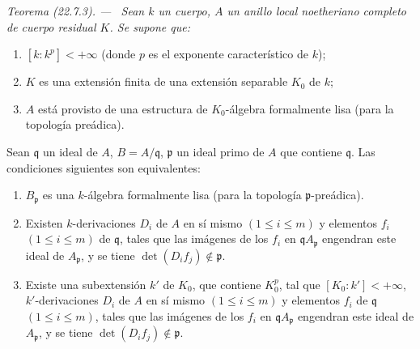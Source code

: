 \documentclass[10pt,oneside]{book}
\makeatletter
\newcommand{\setmanualcurrentlabel}[1]{\def\@currentlabel{#1}}
\newenvironment{theorem}[1][]{%
  \setmanualcurrentlabel{#1}\par\medskip\noindent\itshape Teorema (#1). ---\ }{\par}
\makeatother
\begin{document}
\begin{theorem}[22.7.3]
\label{0.22.7.3-es}
Sean $k$ un cuerpo, $A$ un anillo local noetheriano completo de cuerpo residual
$K$. Se supone que:
\begin{enumerate}
  \item[$1^\circ$] $[k:k^p]<+\infty$ (donde $p$ es el exponente característico
  de $k$);
  \item[$2^\circ$] $K$ es una extensión finita de una extensión separable
  $K_0$ de $k$;
  \item[$3^\circ$] $A$ está provisto de una estructura de $K_0$-álgebra formalmente
  lisa (para la topología preádica).
\end{enumerate}
Sean $\mathfrak q$ un ideal de $A$, $B=A/\mathfrak q$, $\mathfrak p$ un
ideal primo de $A$ que contiene $\mathfrak q$. Las condiciones siguientes son
equivalentes:
\begin{enumerate}
  \item[\textup{a)}] $B_{\mathfrak p}$ es una $k$-álgebra formalmente lisa (para la
  topología $\mathfrak p$-preádica).
  \item[\textup{b)}] Existen $k$-derivaciones $D_i$ de $A$ en sí mismo
  $(1\leq i\leq m)$ y elementos $f_i$ $(1\leq i\leq m)$ de
  $\mathfrak q$, tales que las imágenes de los $f_i$ en
  $\mathfrak qA_{\mathfrak p}$ engendran este ideal de $A_{\mathfrak p}$, y
  se tiene $\det(D_if_j)\notin\mathfrak p$.
  \item[\textup{b')}] Existe una subextensión $k'$ de $K_0$, que contiene $K_0^p$,
  tal que $[K_0:k']<+\infty$, $k'$-derivaciones $D_i$ de $A$ en
  sí mismo $(1\leq i\leq m)$ y elementos $f_i$ de $\mathfrak q$
  $(1\leq i\leq m)$, tales que las imágenes de los $f_i$ en
  $\mathfrak qA_{\mathfrak p}$ engendran este ideal de $A_{\mathfrak p}$, y
  se tiene $\det(D_if_j)\notin\mathfrak p$.
\end{enumerate}
\end{theorem}
\end{document}
